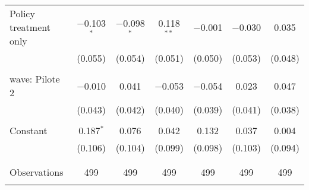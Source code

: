 \begin{tabular}{@{\extracolsep{5pt}}lcccccc}
 Policy treatment only & $-$0.103$^{*}$ & $-$0.098$^{*}$ & 0.118$^{**}$ & $-$0.001 & $-$0.030 & 0.035 \\ 
  & (0.055) & (0.054) & (0.051) & (0.050) & (0.053) & (0.048) \\ 
  & & & & & & \\ 
 wave: Pilote 2 & $-$0.010 & 0.041 & $-$0.053 & $-$0.054 & 0.023 & 0.047 \\ 
  & (0.043) & (0.042) & (0.040) & (0.039) & (0.041) & (0.038) \\ 
  & & & & & & \\ 
 Constant & 0.187$^{*}$ & 0.076 & 0.042 & 0.132 & 0.037 & 0.004 \\ 
  & (0.106) & (0.104) & (0.099) & (0.098) & (0.103) & (0.094) \\ 
  & & & & & & \\ 
\hline \\[-1.8ex] 

Observations & 499 & 499 & 499 & 499 & 499 & 499 \\ 
\hline 
\hline \\[-1.8ex] 
\end{tabular} 